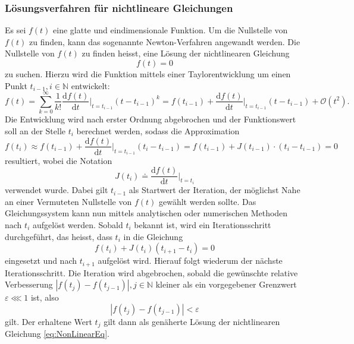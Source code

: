 \documentclass[a4paper,12pt]{article}
\numberwithin{equation}{section}
\begin{document}
\subsubsection{Lösungsverfahren für nichtlineare Gleichungen}
Es sei $f(t)$ eine glatte und eindimensionale Funktion. Um die Nullstelle von $f(t)$ zu finden, kann das sogenannte Newton-Verfahren angewandt werden. Die Nullstelle von $f(t)$ zu finden heisst, eine Lösung der nichtlinearen Gleichung \begin{equation}\label{eq:NonLinearEq}
f(t) = 0
\end{equation} zu suchen. Hierzu wird die Funktion mittels einer Taylorentwicklung um einen Punkt $t_{i-1}, i \in \mathbb{N}$ entwickelt:
\begin{equation}
f(t) = \sum_{k=0}^{\infty} \frac{1}{k!}\frac{\mathrm{d}f(t)}{\mathrm{d}t}\bigg|_{t=t_{i-1}} (t-t_{i-1})^k = f(t_{i-1}) + \frac{\mathrm{d}f(t)}{\mathrm{d}t}\bigg|_{t=t_{i-1}}(t-t_{i-1}) + \mathcal{O}(t^2).
\end{equation} Die Entwicklung wird nach erster Ordnung abgebrochen und der Funktionswert soll an der Stelle $t_{i}$ berechnet werden, sodass die Approximation \begin{equation}
f(t_{i}) \approx f(t_{i-1}) + \frac{\mathrm{d}f(t)}{\mathrm{d}t}\bigg|_{t=t_{i-1}}(t_{i}-t_{i-1}) = f(t_{i-1}) + J(t_{i-1})\cdot (t_{i}-t_{i-1}) = 0
\end{equation} resultiert, wobei die Notation \begin{equation}
J(t_i) \doteq \frac{\mathrm{d}f(t)}{\mathrm{d}t}\bigg|_{t=t_i} 
\end{equation} verwendet wurde. Dabei gilt $t_{i-1}$ als Startwert der Iteration, der möglichst Nahe an einer Vermuteten Nullstelle von $f(t)$ gewählt werden sollte. Das Gleichungssystem kann nun mittels analytischen oder numerischen Methoden nach $t_{i}$ aufgelöst werden. Sobald $t_i$ bekannt ist, wird ein Iterationsschritt durchgeführt, das heisst, dass $t_i$ in die Gleichung \begin{equation}
f(t_{i}) + J(t_{i})(t_{i+1}-t_i) = 0 
\end{equation} eingesetzt und nach $t_{i+1}$ aufgelöst wird. Hierauf folgt wiederum der nächste Iterationsschritt. Die Iteration wird abgebrochen, sobald die gewünschte relative Verbesserung $|f(t_{j})-f(t_{j-1})|,  j \in \mathbb{N}$ kleiner als ein vorgegebener Grenzwert $\varepsilon \lll 1$ ist, also \begin{equation}
|f(t_{j})-f(t_{j-1})| < \varepsilon
\end{equation} gilt. Der erhaltene Wert $t_j$ gilt dann als genäherte Lösung der nichtlinearen Gleichung \eqref{eq:NonLinearEq}.
\end{document}
